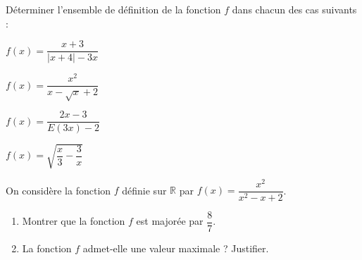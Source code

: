 Déterminer l'ensemble de définition de la fonction $f$ dans chacun des cas suivants :
\begin{enumerate*}[label=\arabic*),itemjoin={\quad}]
\item $f(x)=\dfrac{x+3}{|x+4|-3x}$
\item $f(x)=\dfrac{x^2}{x-\sqrt x+2}$
\item $f(x)=\dfrac{2x-3}{E(3x)-2}$
\item $f(x)=\sqrt{\dfrac x3-\dfrac3x}$
\end{enumerate*}
\fin
{}
On considère la fonction $f$ définie sur $\mathbb{R}$ par $f(x)=\dfrac{x^2}{x^2-x+2}$.
\begin{enumerate}
\item Montrer que la fonction $f$ est majorée par $\dfrac87$.
\item La fonction $f$ admet-elle une valeur maximale ? Justifier.
\end{enumerate}
\fin
